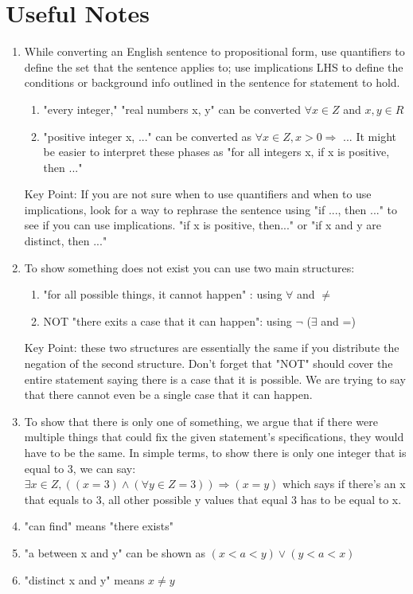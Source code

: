 \documentclass[11pt]{article}
\begin{document}
\section*{Useful Notes}
\begin{enumerate}
\item 
While converting an English sentence to propositional form, use quantifiers to define the set that the sentence applies to; use implications LHS to define the conditions or background info outlined in the sentence for statement to hold.
\begin{enumerate}
\item "every integer," "real numbers x, y" can be converted $\forall x \in Z$ and 
${x,y}\in R$
\item "positive integer x, ..." can be converted as $\forall x \in Z, x>0 \Rightarrow$ ... It might be easier to interpret these phases as "for all integers x, if x is positive, then ..."
\end{enumerate}
Key Point: If you are not sure when to use quantifiers and when to use implications, look for a way to rephrase the sentence using "if ..., then ..." to see if you can use implications. "if x is positive, then..." or "if x and y are distinct, then ..."
\item To show something does not exist you can use two main structures:
\begin{enumerate}
\item "for all possible things, it cannot happen" : using $\forall$ and $\neq$
\item NOT "there exits a case that it can happen": using $\neg $ ($\exists$ and =)
\end{enumerate}
Key Point: these two structures are essentially the same if you distribute the negation of the second structure. Don't forget that "NOT" should cover the entire statement saying there is a case that it is possible. We are trying to say that there cannot even be a single case that it can happen.

\item To show that there is only one of something, we argue that if there were multiple things that could fix the given statement's specifications, they would have to be the same. In simple terms, to show there is only one integer that is equal to 3, we can say: \\ $\exists x \in Z, ((x = 3) \wedge (\forall y \in Z = 3)) \Rightarrow (x = y) $ which says if there's an x that equals to 3, all other possible y values that equal 3 has to be equal to x.

\item  "can find" means "there exists"
\item  "a between x and y" can be shown as $ (x < a <y) \vee (y<  a <x)$
\item "distinct x and y" means $x \neq y$
\end{enumerate}
\newpage
\end{document}
